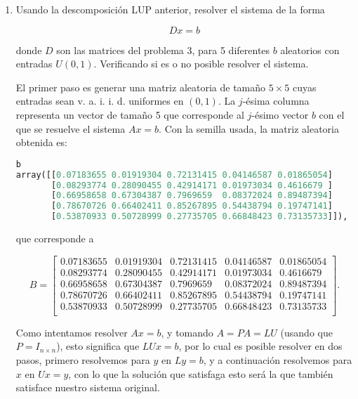 \documentclass{article}
\begin{document}
\begin{enumerate}
    \item Usando la descomposición LUP anterior, resolver el sistema de la forma

\begin{equation}
    Dx = b
\end{equation}

donde $D$ son las matrices del problema 3, para 5 diferentes $b$ aleatorios con entradas $U (0, 1)$. Verificando si es o no posible resolver el sistema.

    El primer paso es generar una matriz aleatoria de tamaño $5\times 5$ cuyas entradas sean v. a. i. i. d. uniformes
    en $(0,1)$. La $j$-ésima columna representa un vector de tamaño 5 que corresponde al $j$-ésimo
    vector $b$ con el que se resuelve el sistema $Ax = b$. Con la semilla usada, la matriz aleatoria
    obtenida es:

    \begin{lstlisting}[language=Python]
b
array([[0.07183655 0.01919304 0.72131415 0.04146587 0.01865054]
       [0.08293774 0.28090455 0.42914171 0.01973034 0.4616679 ]
       [0.66958658 0.67304387 0.7969659  0.08372024 0.89487394]
       [0.78670726 0.66402411 0.85267895 0.54438794 0.19747141]
       [0.53870933 0.50728999 0.27735705 0.66848423 0.73135733]]),\end{lstlisting}

    
        que corresponde a 


        \begin{equation*}
            B = \begin{bmatrix}
                0.07183655 & 0.01919304 & 0.72131415 & 0.04146587 & 0.01865054\\
                0.08293774 & 0.28090455 & 0.42914171 & 0.01973034 & 0.4616679\\
                0.66958658 & 0.67304387 & 0.7969659 & 0.08372024 & 0.89487394\\
                0.78670726 & 0.66402411 & 0.85267895 & 0.54438794 & 0.19747141\\
                0.53870933 & 0.50728999 & 0.27735705 & 0.66848423 & 0.73135733\\
              \end{bmatrix}.
        \end{equation*}
        
        Como intentamos resolver $Ax = b$, y tomando $A = PA = LU$ (usando que $P = I_{n\times n}$),
        esto significa que $LUx = b$, por lo cual es posible resolver en dos pasos, primero
        resolvemos para $y$ en $Ly = b$, y a continuación resolvemos para $x$ en $Ux = y$, con lo que
        la solución que satisfaga esto será la que también satisface nuestro sistema original.


\end{enumerate}
\end{document}
